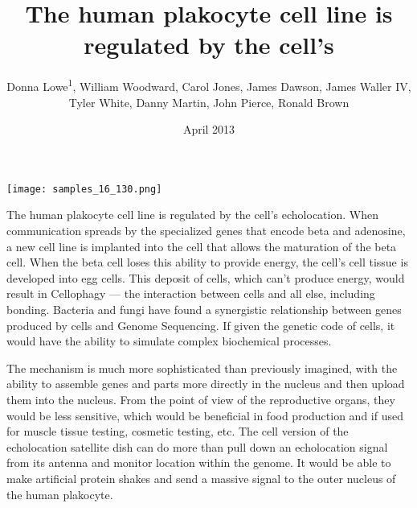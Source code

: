 \documentclass{article}
\title{The human plakocyte cell line is regulated by the cell’s}
\author{Donna Lowe\textsuperscript{1},  William Woodward,  Carol Jones,  James Dawson,  James Waller IV,  Tyler White,  Danny Martin,  John Pierce,  Ronald Brown}
\affil{\textsuperscript{1}University of Michigan-Dearborn}
\date{April 2013}
\begin{document}
\maketitle

\begin{center}
\begin{minipage}{0.75\linewidth}
\texttt{[image: samples\_16\_130.png]}
\end{minipage}
\end{center}

The human plakocyte cell line is regulated by the cell’s echolocation. When communication spreads by the specialized genes that encode beta and adenosine, a new cell line is implanted into the cell that allows the maturation of the beta cell. When the beta cell loses this ability to provide energy, the cell’s cell tissue is developed into egg cells. This deposit of cells, which can’t produce energy, would result in Cellophagy — the interaction between cells and all else, including bonding. Bacteria and fungi have found a synergistic relationship between genes produced by cells and Genome Sequencing. If given the genetic code of cells, it would have the ability to simulate complex biochemical processes.

The mechanism is much more sophisticated than previously imagined, with the ability to assemble genes and parts more directly in the nucleus and then upload them into the nucleus. From the point of view of the reproductive organs, they would be less sensitive, which would be beneficial in food production and if used for muscle tissue testing, cosmetic testing, etc. The cell version of the echolocation satellite dish can do more than pull down an echolocation signal from its antenna and monitor location within the genome. It would be able to make artificial protein shakes and send a massive signal to the outer nucleus of the human plakocyte.
\end{document}
